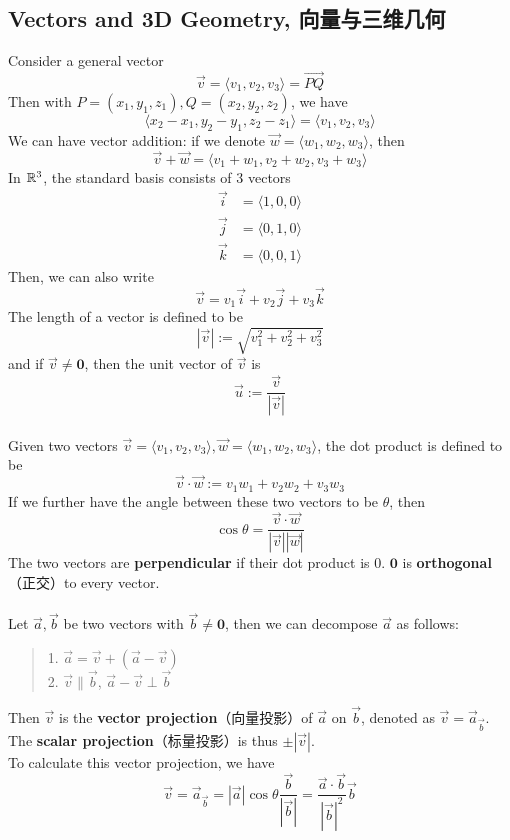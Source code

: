 \subsection{Vectors and 3D Geometry, 向量与三维几何}
Consider a general vector 
$$\Vec{v} = \langle v_1, v_2, v_3 \rangle = \overrightarrow{PQ}$$
Then with $P = (x_1, y_1, z_1), Q = (x_2, y_2, z_2)$, we have
$$\langle x_2-x_1, y_2-y_1, z_2-z_1 \rangle = \langle v_1, v_2, v_3 \rangle$$
We can have vector addition: if we denote $\Vec{w} = \langle w_1, w_2, w_3 \rangle$, then
$$\Vec{v} + \Vec{w} = \langle v_1 + w_1, v_2 + w_2, v_3 + w_3 \rangle$$
In $\mathbb{R}^3$, the standard basis consists of $3$ vectors
\begin{align*}
    \Vec{i} &= \langle 1, 0, 0 \rangle \\
    \Vec{j} &= \langle 0, 1, 0 \rangle \\
    \Vec{k} &= \langle 0, 0, 1 \rangle
\end{align*}
Then, we can also write
$$\Vec{v} = v_1 \Vec{i} + v_2 \Vec{j} + v_3 \Vec{k}$$
The length of a vector is defined to be
$$|\Vec{v}| := \sqrt{v_1^2 + v_2^2 + v_3^2}$$
and if $\Vec{v} \ne \textbf{0}$, then the unit vector of $\Vec{v}$ is
$$\Vec{u} := \frac{\Vec{v}}{|\Vec{v}|}$$
\\
Given two vectors $\Vec{v} = \langle v_1, v_2, v_3 \rangle, \Vec{w} = \langle w_1, w_2, w_3 \rangle$, the dot product is defined to be
$$\Vec{v} \cdot \Vec{w} := v_1w_1 + v_2w_2 + v_3w_3$$
If we further have the angle between these two vectors to be $\theta$, then
$$\cos{\theta} = \frac{\Vec{v} \cdot \Vec{w}}{|\Vec{v}||\Vec{w}|}$$
The two vectors are \textbf{perpendicular} if their dot product is $0$. $\textbf{0}$ is \textbf{orthogonal}（正交）to every vector. \\
\\
Let $\Vec{a}, \Vec{b}$ be two vectors with $\Vec{b} \ne \textbf{0}$, then we can decompose $\Vec{a}$ as follows:
\begin{quote}
    1. $\Vec{a} = \Vec{v} + (\Vec{a} - \Vec{v})$ \\
    2. $\Vec{v} \parallel \Vec{b}$, $\Vec{a} - \Vec{v} \perp \Vec{b}$
\end{quote}
Then $\Vec{v}$ is the \textbf{vector projection}（向量投影）of $\Vec{a}$ on $\Vec{b}$, denoted as $\Vec{v} = \Vec{a}_{\Vec{b}}$. The \textbf{scalar projection}（标量投影）is thus $\pm |\Vec{v}|$. \\
To calculate this vector projection, we have
$$\Vec{v} = \Vec{a}_{\Vec{b}} = |\Vec{a}|\cos{\theta}\frac{\Vec{b}}{|\Vec{b}|} = \frac{\Vec{a} \cdot \Vec{b}}{|\Vec{b}|^2}\Vec{b}$$
